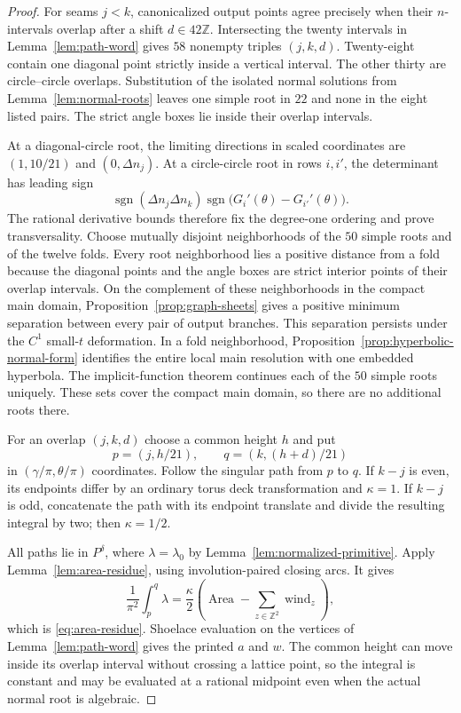 \documentclass[11pt,reqno]{amsart}
\theoremstyle{plain}
\theoremstyle{definition}
\newcommand{\Z}{\mathbb{Z}}
\begin{document}
\begin{proof}
For seams $j<k$, canonicalized output points agree precisely when their $n$-intervals overlap
after a shift $d\in42\Z$.  Intersecting the twenty intervals in Lemma~\ref{lem:path-word} gives
$58$ nonempty triples $(j,k,d)$.  Twenty-eight contain one diagonal point strictly inside a
vertical interval.  The other thirty are circle--circle overlaps.  Substitution of the isolated
normal solutions from Lemma~\ref{lem:normal-roots} leaves one simple root in $22$ and none in the eight
listed pairs.  The strict angle boxes lie inside their overlap intervals.

At a diagonal-circle root, the limiting directions in scaled coordinates are
$(1,10/21)$ and $(0,\Delta n_j)$.  At a circle-circle root in rows $i,i'$, the determinant has
leading sign
\[
 \operatorname{sgn}(\Delta n_j\Delta n_k)
 \operatorname{sgn}\bigl(G_i'(\theta)-G_{i'}'(\theta)\bigr).
\]
The rational derivative bounds therefore fix the degree-one ordering and prove transversality.
Choose mutually disjoint neighborhoods of the $50$ simple roots and of the twelve folds.  Every
root neighborhood lies a positive distance from a fold because the diagonal points and the angle
boxes are strict interior points of their overlap intervals.  On the complement of these
neighborhoods in the compact main domain, Proposition~\ref{prop:graph-sheets} gives a positive
minimum separation between every pair of output branches.  This separation persists under the
$C^1$ small-$t$ deformation.  In a fold neighborhood,
Proposition~\ref{prop:hyperbolic-normal-form} identifies the entire local main resolution with one
embedded hyperbola.  The implicit-function theorem continues each of the $50$ simple roots
uniquely.  These sets cover the compact main domain, so there are no additional roots there.

For an overlap $(j,k,d)$ choose a common height $h$ and put
\[
 p=(j,h/21),
 \qquad
 q=(k,(h+d)/21)
\]
in $(\gamma/\pi,\theta/\pi)$ coordinates.  Follow the singular path from $p$ to $q$.  If $k-j$ is
even, its endpoints differ by an ordinary torus deck transformation and $\kappa=1$.  If $k-j$ is
odd, concatenate the path with its endpoint translate and divide the resulting integral by two;
then $\kappa=1/2$.

All paths lie in $P^\delta$, where $\lambda=\lambda_0$ by
Lemma~\ref{lem:normalized-primitive}.  Apply Lemma~\ref{lem:area-residue}, using
involution-paired closing arcs.  It gives
\[
 \frac1{\pi^2}\int_p^q\lambda
 =\frac\kappa2\left(
   \operatorname{Area}-\sum_{z\in\Z^2}\operatorname{wind}_z\right),
\]
which is \eqref{eq:area-residue}.  Shoelace evaluation on the vertices of
Lemma~\ref{lem:path-word} gives the printed $a$ and $w$.  The common height can move inside its
overlap interval without crossing a lattice point, so the integral is constant and may be
evaluated at a rational midpoint even when the actual normal root is algebraic.


\end{proof}
\end{document}
